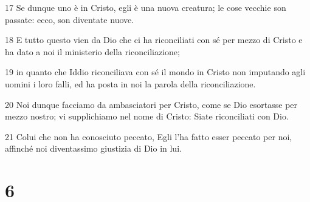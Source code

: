 \par 17 Se dunque uno è in Cristo, egli è una nuova creatura; le cose vecchie son passate: ecco, son diventate nuove.
\par 18 E tutto questo vien da Dio che ci ha riconciliati con sé per mezzo di Cristo e ha dato a noi il ministerio della riconciliazione;
\par 19 in quanto che Iddio riconciliava con sé il mondo in Cristo non imputando agli uomini i loro falli, ed ha posta in noi la parola della riconciliazione.
\par 20 Noi dunque facciamo da ambasciatori per Cristo, come se Dio esortasse per mezzo nostro; vi supplichiamo nel nome di Cristo: Siate riconciliati con Dio.
\par 21 Colui che non ha conosciuto peccato, Egli l'ha fatto esser peccato per noi, affinché noi diventassimo giustizia di Dio in lui.

\chapter{6}

